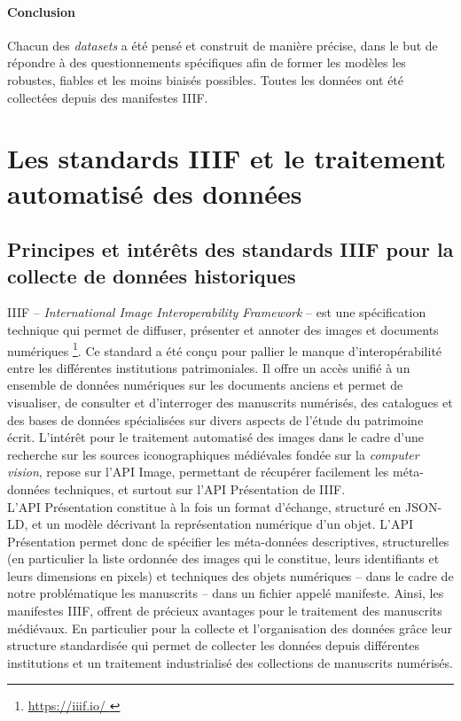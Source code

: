 \documentclass[12pt,twoside]{book}
\begin{document}
\paragraph{Conclusion}Chacun des \textit{datasets} a été pensé et construit de manière précise, dans le but de répondre à des questionnements spécifiques afin de former les modèles les robustes, fiables et les moins biaisés possibles. Toutes les données ont été collectées depuis des manifestes IIIF. 

\section{Les standards IIIF et le traitement automatisé des données}
\subsection{Principes et intérêts des standards IIIF pour la collecte de données historiques}

IIIF -- \textit{International Image Interoperability Framework} -- est une spécification technique qui permet de diffuser, présenter et annoter des images et documents numériques \footnote{\url{https://iiif.io/ }}. Ce standard a été conçu pour pallier le manque d’interopérabilité entre les différentes institutions patrimoniales. Il offre un accès unifié à un ensemble de données numériques sur les documents anciens et permet de visualiser, de consulter et d'interroger des manuscrits numérisés, des catalogues et des bases de données spécialisées sur divers aspects de l'étude du patrimoine écrit. L’intérêt pour le traitement automatisé des images dans le cadre d’une recherche sur les sources iconographiques médiévales fondée sur la \textit{computer vision}, repose sur l’API Image, permettant de récupérer facilement les méta-données techniques, et surtout sur l’API Présentation de IIIF. \\

L’API Présentation constitue à la fois un format d’échange, structuré en JSON-LD, et un modèle décrivant la représentation numérique d’un objet. L’API Présentation permet donc de spécifier les méta-données descriptives, structurelles (en particulier la liste ordonnée des images qui le constitue, leurs identifiants et leurs dimensions en pixels) et techniques des objets numériques -- dans le cadre de notre problématique les manuscrits -- dans un fichier appelé manifeste. Ainsi, les manifestes IIIF, offrent de précieux avantages pour le traitement des manuscrits médiévaux. En particulier pour la collecte et l’organisation des données grâce leur structure standardisée qui permet de collecter les données depuis différentes institutions et un traitement industrialisé des collections de manuscrits numérisés.
\end{document}
